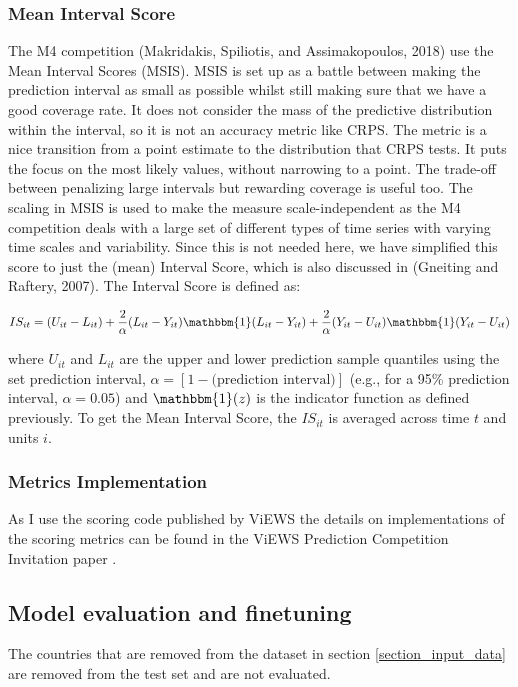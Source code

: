 \documentclass[runningheads]{llncs}
\begin{document}
    \subsubsection{Mean Interval Score}
    The M4 competition (Makridakis, Spiliotis, and Assimakopoulos, 2018) use the Mean Interval Scores (MSIS). MSIS is set up as a battle between making the prediction interval as small as possible whilst still making sure that we have a good coverage rate. It does not consider the mass of the predictive distribution within the interval, so it is not an accuracy metric like CRPS. The metric is a nice transition from a point estimate to the distribution that CRPS tests. It puts the focus on the most likely values, without narrowing to a point. The trade-off between penalizing large intervals but rewarding coverage is useful too. The scaling in MSIS is used to make the measure scale-independent as the M4 competition deals with a large set of different types of time series with varying time scales and variability. Since this is not needed here, we have simplified this score to just the (mean) Interval Score, which is also discussed in (Gneiting and Raftery, 2007). The Interval Score is defined as:

    \begin{equation}
        IS_{it} = (U_{it} - L_{it}) + \frac{2}{\alpha}(L_{it} - Y_{it})\mathbbm{1}(L_{it} - Y_{it}) + \frac{2}{\alpha}(Y_{it} - U_{it})\mathbbm{1}(Y_{it} - U_{it})
    \end{equation}

    where \(U_{it}\) and \(L_{it}\) are the upper and lower prediction sample quantiles using the set prediction interval, \(\alpha = [1 - \text{(prediction interval)}]\) (e.g., for a 95\% prediction interval, \(\alpha = 0.05\)) and \(\mathbbm{1}(z)\) is the indicator function as defined previously. To get the Mean Interval Score, the \(IS_{it}\) is averaged across time \(t\) and units \(i\).

    \subsubsection{Metrics Implementation} As I use the scoring code published by ViEWS the details on implementations of the scoring metrics can be found in the ViEWS Prediction Competition Invitation paper \cite{predictionchallenge2023}.

    \subsection{Model evaluation and finetuning}
    The countries that are removed from the dataset in section \ref{section_input_data} are removed from the test set and are not evaluated.
\end{document}
